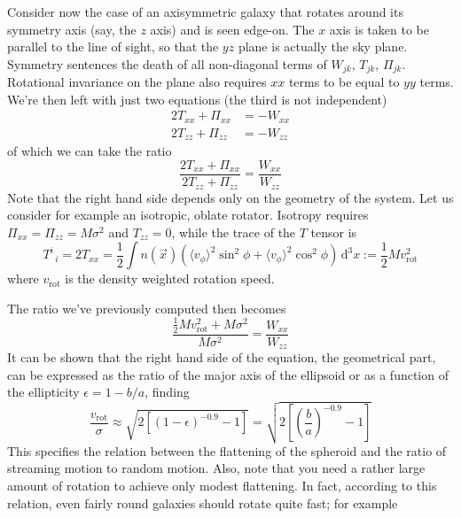 Consider now the case of an axisymmetric galaxy that rotates around its symmetry axis (say, the $z$ axis) and is seen edge-on. The $x$ axis is taken to be parallel to the line of sight, so that the $yz$ plane is actually the sky plane. Symmetry sentences the death of all non-diagonal terms of $W_{jk}$, $T_{jk}$, $\Pi_{jk}$. Rotational invariance on the plane also requires $xx$ terms to be equal to $yy$ terms. We're then left with just two equations (the third is not independent)
\begin{align*}
    2T_{xx}+\Pi_{xx} &= -W_{xx}\\
    2T_{zz}+\Pi_{zz} &= -W_{zz}
\end{align*}
of which we can take the ratio
\begin{equation*}
    \frac{2T_{xx}+\Pi_{xx}}{2T_{zz}+\Pi_{zz}} = \frac{W_{xx}}{W_{zz}}
\end{equation*}
Note that the right hand side depends only on the geometry of the system. Let us consider for example an isotropic, oblate rotator. Isotropy requires $\Pi_{xx} = \Pi_{zz} = M\sigma^{2}$ and $T_{zz} = 0$, while the trace of the $T$ tensor is 
\begin{equation*}
    T^{i}_{\;\;i} = 2T_{xx} = \frac{1}{2}\int n(\vec{x})(\langle v_{\phi}\rangle^{2}\sin^{2}\phi + \langle v_{\phi}\rangle^{2}\cos^{2}\phi)\,\text{d}^{3}x := \frac{1}{2}Mv^{2}_{\text{rot}}
\end{equation*}
where $v_{\text{rot}}$ is the density weighted rotation speed.
\par The ratio we've previously computed then becomes 
\begin{equation*}
    \frac{\frac{1}{2}Mv^{2}_{\text{rot}}+M\sigma^{2}}{M\sigma^{2}} = \frac{W_{xx}}{W_{zz}}
\end{equation*}
It can be shown that the right hand side of the equation, the geometrical part, can be expressed as the ratio of the major axis of the ellipsoid or as a function of the ellipticity $\epsilon = 1-b/a$, finding 
\begin{equation}
    \frac{v_{\text{rot}}}{\sigma} \approx \sqrt{2\left[(1-\epsilon)^{-0.9}-1\right]} = \sqrt{2\left[\left(\frac{b}{a}\right)^{-0.9}-1\right]}
    \label{eq:isoblator}
\end{equation}
This specifies the relation between the flattening of the spheroid and the ratio of streaming motion to random motion. Also, note that you need a rather large amount of rotation to achieve only modest flattening. In fact, according to this relation, even fairly round galaxies should rotate quite fast; for example
